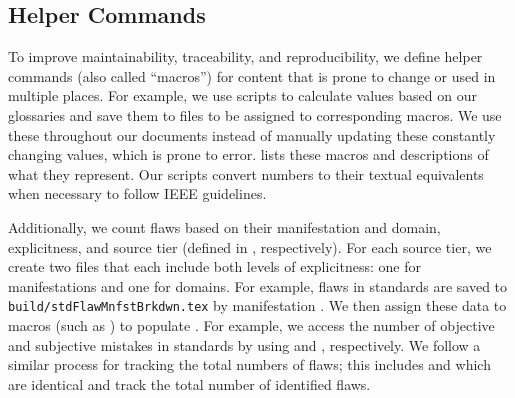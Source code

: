 \subsection{Helper Commands}\label{macros}
To improve maintainability, traceability, and reproducibility, we define
helper commands (also called ``macros'') for content that is prone to change
or used in multiple places. For example, we use scripts to calculate
values based on our glossaries and save them to files to be assigned to
corresponding macros. We use these throughout our documents instead of
manually updating these constantly changing values, which is prone to error.
 lists these macros and descriptions of what they
represent. Our scripts convert numbers to their textual equivalents when
necessary to follow IEEE guidelines.



\label{flawCounts}
Additionally, we count flaws based on their manifestation and domain,
explicitness, and source tier (defined in , respectively).
For each source tier, we create two files that each include both levels of
explicitness: one for manifestations and one for domains. For example, flaws in
standards are saved to \texttt{build/stdFlawMnfstBrkdwn.tex} by manifestation%
. We then assign these data to macros (such as ) to
populate . For example, we access the number
of objective and subjective mistakes in standards by using
 and , respectively.
We follow a similar process for tracking the total numbers of flaws; this
includes  and 
which are identical and track the total number of identified flaws.

